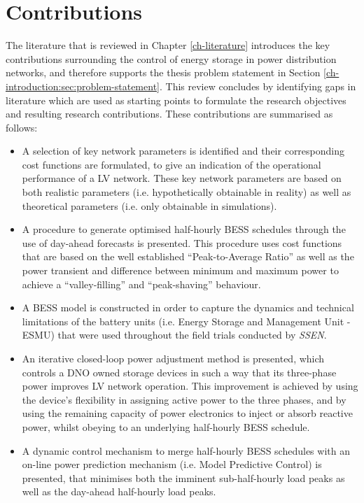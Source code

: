 \section{Contributions}
\label{ch-introduction:sec:contributions}

The literature that is reviewed in Chapter \ref{ch-literature} introduces the key contributions surrounding the control of energy storage in power distribution networks, and therefore supports the thesis problem statement in Section \ref{ch-introduction:sec:problem-statement}.
This review concludes by identifying gaps in literature which are used as starting points to formulate the research objectives and resulting research contributions.
These contributions are summarised as follows:

\begin{itemize}
	\item
	A selection of key network parameters is identified and their corresponding cost functions are formulated, to give an indication of the operational performance of a LV network.
	These key network parameters are based on both realistic parameters (i.e. hypothetically obtainable in reality) as well as theoretical parameters (i.e. only obtainable in simulations).
	\item
	A procedure to generate optimised half-hourly BESS schedules through the use of day-ahead forecasts is presented.
	This procedure uses cost functions that are based on the well established ``Peak-to-Average Ratio'' as well as the power transient and difference between minimum and maximum power to achieve a ``valley-filling'' and ``peak-shaving'' behaviour.
	\item
	A BESS model is constructed in order to capture the dynamics and technical limitations of the battery units (i.e. Energy Storage and Management Unit - ESMU) that were used throughout the field trials conducted by \textit{SSEN}.
	\item
	An iterative closed-loop power adjustment method is presented, which controls a DNO owned storage devices in such a way that its three-phase power improves LV network operation.
	This improvement is achieved by using the device's flexibility in assigning active power to the three phases, and by using the remaining capacity of power electronics to inject or absorb reactive power, whilst obeying to an underlying half-hourly BESS schedule.
	\item
	A dynamic control mechanism to merge half-hourly BESS schedules with an on-line power prediction mechanism (i.e. Model Predictive Control) is presented, that minimises both the imminent sub-half-hourly load peaks as well as the day-ahead half-hourly load peaks.

\end{itemize}
